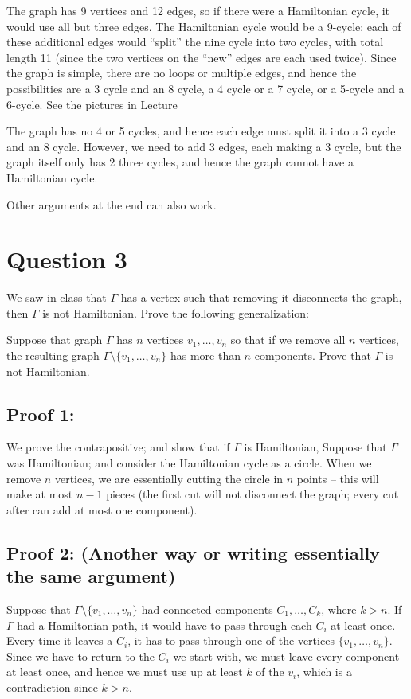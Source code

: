 \documentclass{amsart}
\begin{document}
The graph has 9 vertices and 12 edges, so if there were a Hamiltonian cycle, it would use all but three edges.  The Hamiltonian cycle would be a 9-cycle; each of these additional edges would ``split'' the nine cycle into two cycles, with total length 11 (since the two vertices on the ``new'' edges are each used twice).  Since the graph is simple, there are no loops or multiple edges, and hence the possibilities are a 3 cycle and an 8 cycle, a 4 cycle or a 7 cycle, or a 5-cycle and a 6-cycle.  See the pictures in Lecture 

The graph has no 4 or 5 cycles, and hence each edge must split it into a 3 cycle and an 8 cycle.  However, we need to add 3 edges, each making a 3 cycle, but the graph itself only has 2 three cycles, and hence the graph cannot have a Hamiltonian cycle. 

Other arguments at the end can also work.


\section{Question 3}

We saw in class that $\Gamma$ has a vertex such that removing it disconnects the graph, then $\Gamma$ is not Hamiltonian.  Prove the following generalization:

Suppose that graph $\Gamma$ has $n$ vertices $v_1,\dots, v_n$ so that if we remove all $n$ vertices, the resulting graph $\Gamma\setminus \{v_1,\dots, v_n\}$ has more than $n$ components.  Prove that $\Gamma$ is not Hamiltonian.  



\subsection{Proof 1:}
We prove the contrapositive; and show that if $\Gamma$ is Hamiltonian, 
  Suppose that $\Gamma$ was Hamiltonian; and consider the Hamiltonian cycle as a circle.  When we remove $n$ vertices, we are essentially cutting the circle in $n$ points -- this will make at most $n-1$ pieces (the first cut will not disconnect the graph; every cut after can add at most one component).

\subsection{Proof 2: (Another way or writing essentially the same argument)}

Suppose that $\Gamma\setminus \{ v_1,\dots, v_n\}$ had connected components $C_1,\dots, C_k$, where $k>n$.  If $\Gamma$ had a Hamiltonian path, it would have to pass through each $C_i$ at least once.  Every time it leaves a $C_i$, it has to pass through one of the vertices $\{v_1,\dots, v_n\}$.  Since we have to return to the $C_i$ we start with, we must leave every component at least once, and hence we must use up at least $k$ of the $v_i$, which is a contradiction since $k>n$.
\end{document}
